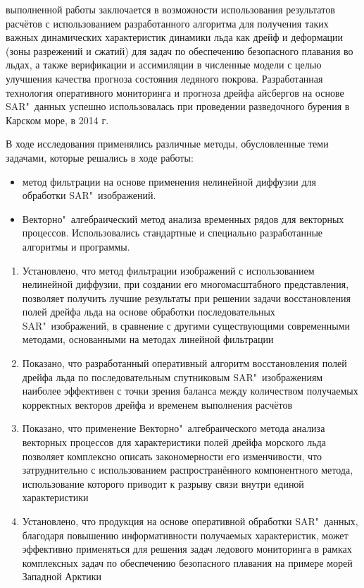 {\influence} выполненной работы заключается в возможности использования результатов расчётов с использованием разработанного алгоритма для получения таких важных динамических характеристик динамики льда как дрейф и деформации (зоны разрежений и сжатий) для задач по обеспечению безопасного плавания во льдах, а также верификации и ассимиляции в численные модели с целью улучшения качества прогноза состояния ледяного покрова. 
Разработанная технология оперативного мониторинга и прогноза дрейфа айсбергов на основе SAR"~данных успешно использовалась при проведении разведочного бурения в Карском море, в 2014 г.

{\methods} В ходе исследования применялись различные методы, обусловленные теми задачами, которые решались в ходе работы:
\noindent
\begin{itemize}
	\item метод фильтрации на основе применения нелинейной диффузии для обработки SAR"~изображений.
	\item Векторно"~алгебраический метод анализа временных рядов для векторных процессов.
Использовались стандартные и специально разработанные алгоритмы и программы.
\end{itemize}


{}
\begin{enumerate}
  \item Установлено, что метод фильтрации изображений с использованием нелинейной диффузии, при создании его многомасштабного представления, позволяет получить лучшие результаты при решении задачи восстановления полей дрейфа льда на основе обработки последовательных SAR"~изображений, в сравнение с другими существующими современными методами, основанными на методах линейной фильтрации
  \item Показано, что разработанный оперативный алгоритм восстановления полей дрейфа льда по последовательным спутниковым SAR"~изображениям наиболее эффективен с точки зрения баланса между количеством получаемых корректных векторов дрейфа и временем выполнения расчётов
  \item Показано, что применение Векторно"~алгебраического метода анализа векторных процессов для характеристики полей дрейфа морского льда позволяет комплексно описать закономерности его изменчивости, что затруднительно с использованием распространённого компонентного метода, использование которого приводит к разрыву связи внутри единой характеристики
  \item Установлено, что продукция на основе оперативной обработки SAR"~данных, благодаря повышению информативности получаемых характеристик, может эффективно применяться для решения задач ледового мониторинга в рамках комплексных задач по обеспечению безопасного плавания на примере морей Западной Арктики
\end{enumerate}


